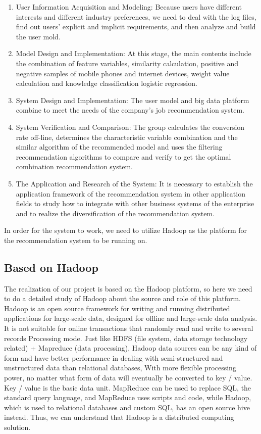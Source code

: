 \documentclass[sigconf]{acmart}
\begin{document}
\begin{enumerate}
  \item  User Information Acquisition and Modeling: Because users have different interests and different industry preferences, we need to deal with the log files, find out users' explicit and implicit requirements, and then analyze and build the user mold.\cite{Standford}
  \item Model Design and Implementation: At this stage, the main contents include the combination of feature variables, similarity calculation, positive and negative samples of mobile phones and internet devices, weight value calculation and knowledge classification logistic regression.\cite{Standford}
  \item System Design and Implementation: The user model and big data platform combine to meet the needs of the company's job recommendation system.\cite{Standford}
  \item System Verification and Comparison: The group calculates the conversion rate off-line, determines the characteristic variable combination and the similar algorithm of the recommended model and uses the filtering recommendation algorithms to compare and verify to get the optimal combination recommendation system.\cite{Standford}
  \item The Application and Research of the System: It is necessary to establish the application framework of the recommendation system in other application fields to study how to integrate with other business systems of the enterprise and to realize the diversification of the recommendation system.\cite{Standford}

\end{enumerate}

In order for the system to work, we need to utilize Hadoop as the platform for the recommendation system to be running on.

\subsection{Based on Hadoop}
The realization of our project is based on the Hadoop platform, so here we need to do a detailed study of Hadoop about the source and role of this platform. Hadoop is an open source framework for writing and running distributed applications for large-scale data, designed for offline and large-scale data analysis.\cite{Standford} It is not suitable for online transactions that randomly read and write to several records Processing mode. Just like HDFS (file system, data storage technology related) + Mapreduce (data processing), Hadoop data sources can be any kind of form and have better performance in dealing with semi-structured and unstructured data than relational databases, With more flexible processing power, no matter what form of data will eventually be converted to key / value. Key / value is the basic data unit.\cite{Standford} MapReduce can be used to replace SQL, the standard query language, and MapReduce uses scripts and code, while Hadoop, which is used to relational databases and custom SQL, has an open source hive instead. Thus, we can understand that Hadoop is a distributed computing solution.
\end{document}
